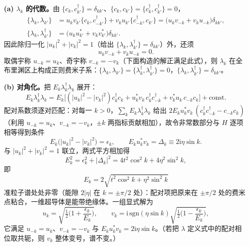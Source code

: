 \textbf{(a) $\lambda_k$ 的代数。}由 $\{c_k,c^\dagger_{k'}\}=\delta_{kk'}$、$\{c_k,c_{k'}\}=\{c^\dagger_k,c^\dagger_{k'}\}=0$，
\begin{align*}
\{\lambda_k,\lambda_{k'}\}&=u_kv_{k'}\{c_k,c^\dagger_{-k'}\}+v_ku_{k'}\{c^\dagger_{-k},c_{k'}\}
=\big(u_kv_{-k}+v_ku_{-k}\big)\delta_{kk'},\\
\{\lambda_k,\lambda^\dagger_{k'}\}&=\big(u_ku^*_{k'}+v_kv^*_{k'}\big)\delta_{kk'} .
\end{align*}
因此除归一化 $|u_k|^2+|v_k|^2=1$（给出 $\{\lambda_k,\lambda^\dagger_{k'}\}=\delta_{kk'}$）外，还须
\begin{equation*}
u_kv_{-k}+v_ku_{-k}=0 .
\end{equation*}
取偶宇称 $u_{-k}=u_k$、奇宇称 $v_{-k}=-v_k$（下面构造的解正满足此式），则 $\lambda_k$ 在全布里渊区上构成正则费米子系：$\{\lambda_k,\lambda_{k'}\}=\{\lambda^\dagger_k,\lambda^\dagger_{k'}\}=0$，$\{\lambda_k,\lambda^\dagger_{k'}\}=\delta_{kk'}$。

\textbf{(b) 对角化。}把 $E_k\lambda^\dagger_k\lambda_k$ 展开：
\begin{equation*}
E_k\lambda^\dagger_k\lambda_k
=E_k\big[(|u_k|^2-|v_k|^2)c^\dagger_kc_k
+u^*_kv_k\,c^\dagger_kc^\dagger_{-k}
+v^*_ku_k\,c_{-k}c_k\big]+\text{const}.
\end{equation*}
配对系数须逐对匹配：对每一 $k>0$，$\sum_kE_k\lambda^\dagger_k\lambda_k$ 给出 $2E_ku^*_kv_k\,(c^\dagger_kc^\dagger_{-k}-c_{-k}c_k)$（利用 $u_{-k}=u_k$、$v_{-k}=-v_k$，$\pm k$ 两指标贡献相加），故令非常数部分与 $H$ 逐项相等得到条件
\begin{equation*}
E_k\big(|u_k|^2-|v_k|^2\big)=\epsilon_k,\qquad
E_ku^*_kv_k=\Delta_k\equiv2\mathrm{i}\eta\sin k .
\end{equation*}
与 $|u_k|^2+|v_k|^2=1$ 联立，两式平方相加得
\begin{equation*}
E_k^2=\epsilon_k^2+|\Delta_k|^2=4t^2\cos^2k+4\eta^2\sin^2k,
\end{equation*}
即
\begin{equation*}
\boxed{\;E_k=2\sqrt{t^2\cos^2k+\eta^2\sin^2k}\;}
\end{equation*}
准粒子谱处处非零（能隙 $2|\eta|$ 在 $k=\pm\pi/2$ 处）：配对项把原来在 $\pm\pi/2$ 处的费米点粘合，一维超导体是能带绝缘体。一组显式解为
\begin{equation*}
u_k=\sqrt{\tfrac12\Big(1+\frac{\epsilon_k}{E_k}\Big)},\qquad
v_k=\mathrm{i}\,\mathrm{sgn}(\eta\sin k)\sqrt{\tfrac12\Big(1-\frac{\epsilon_k}{E_k}\Big)} ,
\end{equation*}
它满足 $u_{-k}=u_k$、$v_{-k}=-v_k$ 与 $E_ku^*_kv_k=2\mathrm{i}\eta\sin k$。（若把 $\lambda$ 定义式中的配对相位取共轭，则 $v_k$ 整体变号，谱不变。）

